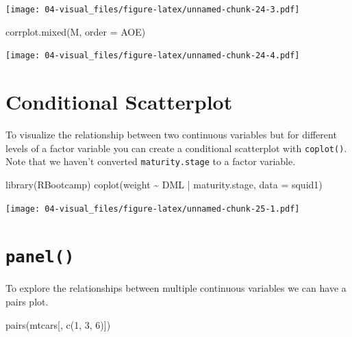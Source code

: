 \documentclass[
]{book}
\newenvironment{Shaded}{\begin{snugshade}}{\end{snugshade}}
\newcommand{\AttributeTok}[1]{\textcolor[rgb]{0.77,0.63,0.00}{#1}}
\newcommand{\DecValTok}[1]{\textcolor[rgb]{0.00,0.00,0.81}{#1}}
\newcommand{\FunctionTok}[1]{\textcolor[rgb]{0.00,0.00,0.00}{#1}}
\newcommand{\NormalTok}[1]{#1}
\newcommand{\SpecialCharTok}[1]{\textcolor[rgb]{0.00,0.00,0.00}{#1}}
\newcommand{\StringTok}[1]{\textcolor[rgb]{0.31,0.60,0.02}{#1}}
\begin{document}
\texttt{[image: 04-visual\_files/figure-latex/unnamed-chunk-24-3.pdf]}

\begin{Shaded}
\begin{Highlighting}[]
\FunctionTok{corrplot.mixed}\NormalTok{(M, }\AttributeTok{order =} \StringTok{\textquotesingle{}AOE\textquotesingle{}}\NormalTok{)}
\end{Highlighting}
\end{Shaded}

\texttt{[image: 04-visual\_files/figure-latex/unnamed-chunk-24-4.pdf]}

\hypertarget{conditional-scatterplot}{%
\section{Conditional Scatterplot}\label{conditional-scatterplot}}

To visualize the relationship between two continuous variables but for different levels of a factor variable you can create a conditional scatterplot with \texttt{coplot()}. Note that we haven't converted \texttt{maturity.stage} to a factor variable.

\begin{Shaded}
\begin{Highlighting}[]
\FunctionTok{library}\NormalTok{(RBootcamp)}
\FunctionTok{coplot}\NormalTok{(weight }\SpecialCharTok{\textasciitilde{}}\NormalTok{ DML }\SpecialCharTok{|}\NormalTok{ maturity.stage, }\AttributeTok{data =}\NormalTok{ squid1)}
\end{Highlighting}
\end{Shaded}

\texttt{[image: 04-visual\_files/figure-latex/unnamed-chunk-25-1.pdf]}

\hypertarget{panel}{%
\section{\texorpdfstring{\texttt{panel()}}{panel()}}\label{panel}}

To explore the relationships between multiple continuous variables we can have a pairs plot.

\begin{Shaded}
\begin{Highlighting}[]
\FunctionTok{pairs}\NormalTok{(mtcars[, }\FunctionTok{c}\NormalTok{(}\DecValTok{1}\NormalTok{, }\DecValTok{3}\NormalTok{, }\DecValTok{6}\NormalTok{)])}
\end{Highlighting}
\end{Shaded}
\end{document}
